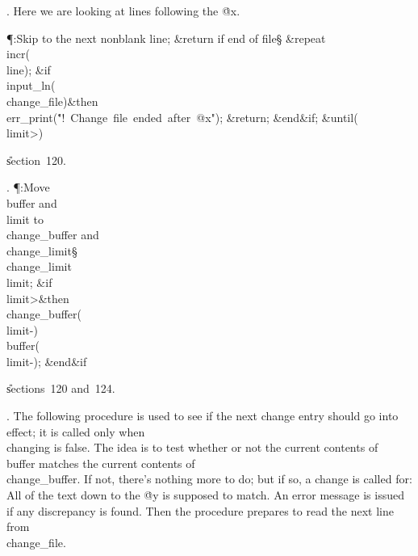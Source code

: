 . Here we are looking at lines following the \.{@x}.

\Y\P\?\4:Skip to the next nonblank line; \&{return} if end of file\X\S\?\6
\1\&{repeat}\6
\\{incr}\?\1(\?\\{line}\?\2)\?;\6
\&{if}\1\1\?\8\R\?\\{input\_ln}\?\1(\?\\{change\_file}\?\2)\?\2\8\&{then}\6
\\{err\_print}\?\1(\?\.{"!\ Change\ file\ ended\ after\ @x"}\?\2)\?;\6
\&{return};\2\6
\&{end}\8\2\&{if}\1;\2\6
\&{until}\?\8\1(\?\\{limit}\?>\?\2)\?\par
\U section~120.\fi

. \P\?:Move \\{buffer} and \\{limit} to \\{change\_buffer} and %
\\{change\_limit}\X\S\?\6
\\{change\_limit}\?\K\?\\{limit};\6
\&{if}\1\1\8\\{limit}\?>\2\8\&{then}\6
\\{change\_buffer}\?\1(\?\to\?\\{limit}\?-\?\2)\K\?\\{buffer}\?\1(\?%
\to\?\\{limit}\?-\?\2)\?;\2\6
\&{end}\8\2\&{if}\1\par
\U sections~120 and~124.\fi

. The following procedure is used to see if the next change entry should
go into effect; it is called only when \\{changing} is false.
The idea is to test whether or not the current
contents of \\{buffer} matches the current contents of \\{change\_buffer}.
If not, there's nothing more to do; but if so, a change is called for:
All of the text down to the \.{@y} is supposed to match. An error
message is issued if any discrepancy is found. Then the procedure
prepares to read the next line from \\{change\_file}.

